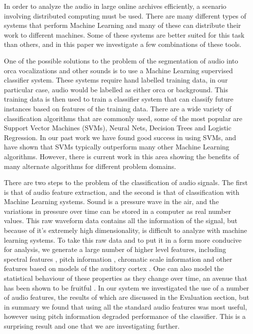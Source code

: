 \documentclass[12pt,oneside]{book}
\begin{document}
In order to analyze the audio in large online archives efficiently, a
scenario involving distributed computing must be used.  There are many
different types of systems that perform Machine Learning and many of
these can distribute their work to different machines.  Some of these
systems are better suited for this task than others, and in this paper
we investigate a few combinations of these tools.

One of the possible solutions to the problem of the segmentation of
audio into orca vocalizations and other sounds is to use a Machine
Learning supervised classifier system.  These systems require hand
labelled training data, in our particular case, audio would be
labelled as either orca or background.  This training data is then
used to train a classifier system that can classify future instances
based on features of the training data.  There are a wide variety of
classification algorithms that are commonly used, some of the most
popular are Support Vector Machines (SVMs), Neural Nets, Decision
Trees and Logistic Regression.  In our past work we have found good
success in using SVMs, and have shown that SVMs typically outperform
many other Machine Learning algorithms.  However, there is current
work in this area showing the benefits of many alternate algorithms
for different problem domains.

There are two steps to the problem of the classification of audio
signals.  The first is that of audio feature extraction, and the
second is that of classification with Machine Learning systems.  Sound
is a pressure wave in the air, and the variations in pressure over
time can be stored in a computer as real number values.  This raw
waveform data contains all the information of the signal, but because
of it's extremely high dimensionality, is difficult to analyze with
machine learning systems.  To take this raw data and to put it in a
form more conducive for analysis, we generate a large number of higher
level features, including spectral features \cite{marsyas}, pitch
information \cite{cheveigne02}, chromatic scale information
\cite{marsyas} and other features based on models of the auditory
cortex \cite{lyon82}.  One can also model the statistical behaviour of
these properties as they change over time, an avenue that has been
shown to be fruitful \cite{marsyas}.  In our system we investigated
the use of a number of audio features, the results of which are
discussed in the Evaluation section, but in summary we found that
using all the standard audio features was most useful, however using
pitch information degraded performance of the classifier.  This is a
surprising result and one that we are investigating further.
\end{document}
